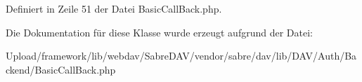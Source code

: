 Definiert in Zeile 51 der Datei Basic\+Call\+Back.\+php.



Die Dokumentation für diese Klasse wurde erzeugt aufgrund der Datei\+:\begin{DoxyCompactItemize}
\item 
Upload/framework/lib/webdav/\+Sabre\+D\+A\+V/vendor/sabre/dav/lib/\+D\+A\+V/\+Auth/\+Backend/Basic\+Call\+Back.\+php\end{DoxyCompactItemize}
